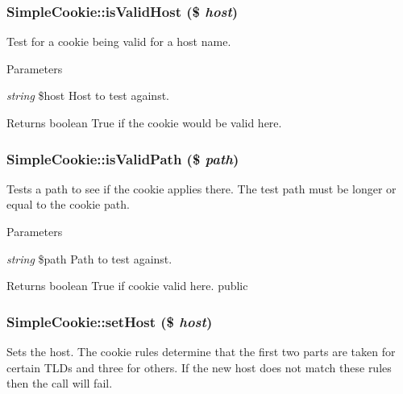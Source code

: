 \hypertarget{class_simple_cookie_a1a063235b39da20c35c4f07a6780b483}{
\subsubsection[{isValidHost}]{\setlength{\rightskip}{0pt plus 5cm}SimpleCookie::isValidHost (\$ {\em host})}}
\label{class_simple_cookie_a1a063235b39da20c35c4f07a6780b483}
Test for a cookie being valid for a host name. 
\begin{DoxyParams}{Parameters}
\item[{\em string}]\$host Host to test against. \end{DoxyParams}
\begin{DoxyReturn}{Returns}
boolean True if the cookie would be valid here. 
\end{DoxyReturn}
\hypertarget{class_simple_cookie_aa83733e9cf866c9711bf464088a292f5}{
\subsubsection[{isValidPath}]{\setlength{\rightskip}{0pt plus 5cm}SimpleCookie::isValidPath (\$ {\em path})}}
\label{class_simple_cookie_aa83733e9cf866c9711bf464088a292f5}
Tests a path to see if the cookie applies there. The test path must be longer or equal to the cookie path. 
\begin{DoxyParams}{Parameters}
\item[{\em string}]\$path Path to test against. \end{DoxyParams}
\begin{DoxyReturn}{Returns}
boolean True if cookie valid here.  public 
\end{DoxyReturn}
\hypertarget{class_simple_cookie_a8fdb8a634ffc188eaf881382b2cc2653}{
\subsubsection[{setHost}]{\setlength{\rightskip}{0pt plus 5cm}SimpleCookie::setHost (\$ {\em host})}}
\label{class_simple_cookie_a8fdb8a634ffc188eaf881382b2cc2653}
Sets the host. The cookie rules determine that the first two parts are taken for certain TLDs and three for others. If the new host does not match these rules then the call will fail. 
